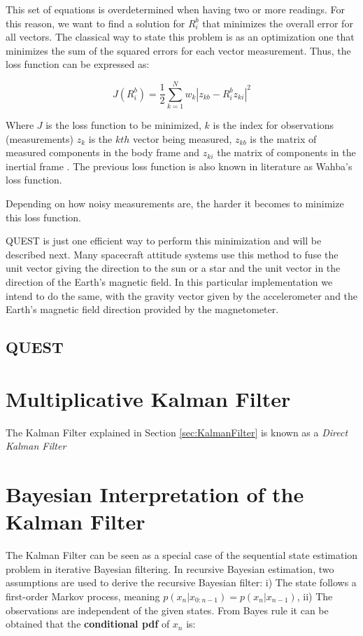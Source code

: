 \documentclass[a4paper,10pt]{article}
\begin{document}
This set of equations is overdetermined when having two or more readings. For this reason, we want to find a solution for $R^b_i$ that minimizes the overall error for all vectors. The classical way to state this problem is as an optimization one that minimizes the sum of the squared errors for each vector measurement. Thus, the loss function can be expressed as:

\begin{equation}
 J(R^b_i) = \frac{1}{2}  \sum^{N}_{k=1}  w_k \left| z_{kb} - R^b_i z_{ki} \right|^2 
\end{equation}

Where $J$ is the loss function to be minimized, $k$ is the index for observations (measurements) $z_{k}$ is the $kth$ vector being measured, $z_{kb}$ is the matrix of measured components in the body frame and $z_{ki}$ the matrix of components in the inertial frame \cite{HallNotes2003}. The previous loss function is also known in literature as Wahba's loss function. 

Depending on how noisy measurements are, the harder it becomes to minimize this loss function. 

QUEST is just one efficient way to perform this minimization and will be described next. Many spacecraft attitude systems use this method to fuse the unit vector giving the direction to the sun or a star and the unit vector in the direction of the Earth's magnetic field. In this particular implementation we intend to do the same, with the gravity vector given by the accelerometer and the Earth's magnetic field direction provided by the magnetometer.

\subsection{QUEST}

\section{Multiplicative Kalman Filter}
The Kalman Filter explained in Section \ref{sec:KalmanFilter} is known as a \emph{Direct Kalman Filter} 


\section{Bayesian Interpretation of the Kalman Filter}
The Kalman Filter can be seen as a special case of the sequential state estimation problem in iterative Bayesian filtering. In recursive Bayesian estimation, two assumptions are used to derive the recursive Bayesian filter: i) The state follows a first-order Markov process, meaning $p(x_n | x_{0:n-1}) = p(x_n | x_{n-1})$, ii) The observations are independent of the given states. From Bayes rule it can be obtained that the \textbf{conditional pdf} of $x_n$  is:
\end{document}
